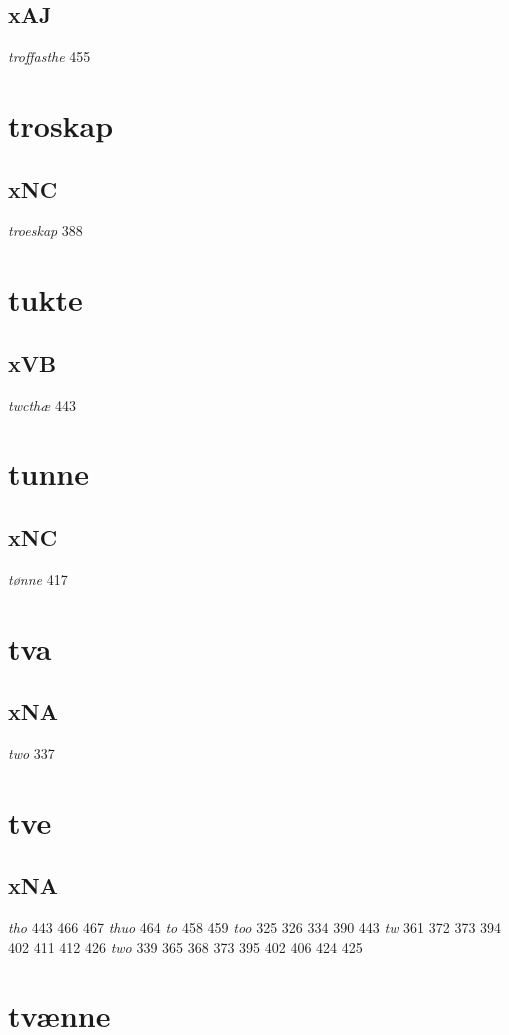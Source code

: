 \documentclass[a4paper,twocolumn]{article}
\begin{document}
\subsection{xAJ}
\label{sec:orgd402d26}
\emph{troffasthe} 455 
\section{troskap}
\label{sec:orgf6ad2ba}
\subsection{xNC}
\label{sec:orgb89c643}
\emph{troeskap} 388 
\section{tukte}
\label{sec:orga0b8c96}
\subsection{xVB}
\label{sec:orgbab1b42}
\emph{twcthæ} 443 
\section{tunne}
\label{sec:org5a5f6f8}
\subsection{xNC}
\label{sec:org2224a0f}
\emph{tønne} 417 
\section{tva}
\label{sec:org917bf13}
\subsection{xNA}
\label{sec:orgc320eec}
\emph{two} 337 
\section{tve}
\label{sec:orgb655933}
\subsection{xNA}
\label{sec:org9fccc7b}
\emph{tho} 443 466 467 \emph{thuo} 464 \emph{to} 458 459 \emph{too} 325 326 334 390 443 \emph{tw} 361 372 373 394 402 411 412 426 \emph{two} 339 365 368 373 395 402 406 424 425 
\section{tvænne}
\label{sec:orgbc7a334}
\end{document}
